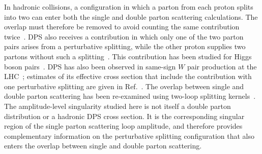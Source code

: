 In hadronic collisions, a configuration in which a parton from
each proton splits into two can enter both the single and
double parton scattering calculations. The overlap must
therefore be removed to avoid counting the same
contribution twice~\cite{DiehlSchafer2011,BDFS2012,BDFS2014,Manohar:2012pe,Gaunt:2012dd,Diehl:2019rdh,DiehlGauntSchoenwald2017,Buffing:2017mqm,Buffing:2017mqmErratum}.
DPS also receives a contribution in which only one of the
two parton pairs arises from a perturbative splitting,
while the other proton supplies two partons without such
a splitting~\cite{BDFS2011,DiehlSchafer2011,RyskinSnigirev2011,BDFS2012,BDFS2014}. This contribution has been studied for Higgs
boson pairs~\cite{GauntMaciulaSzczurek2014}.
DPS has also been observed
in same-sign $W$ pair production at the
LHC~\cite{CMS:2022pio,ATLAS:2025dps}; estimates of its effective cross section that include the contribution with one perturbative splitting are given in Ref.~\cite{BDFS2014}. The overlap between single
and double parton scattering has been re-examined using two-loop
splitting kernels~\cite{DiehlPloessl2026}. The amplitude-level singularity studied here is not itself a double parton distribution or a hadronic DPS cross section. It is the corresponding singular region of the single parton scattering loop amplitude, and therefore provides complementary information on the perturbative splitting configuration that also enters the overlap between single and double parton scattering.

